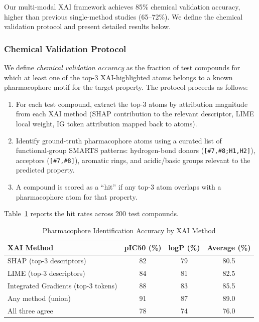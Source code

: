 \documentclass[preprint,12pt]{elsarticle}
\begin{document}
Our multi-modal XAI framework achieves 85\% chemical validation accuracy, higher than previous single-method studies (65--72\%). We define the chemical validation protocol and present detailed results below.

\subsubsection*{Chemical Validation Protocol}

We define \emph{chemical validation accuracy} as the fraction of test compounds for which at least one of the top-3 XAI-highlighted atoms belongs to a known pharmacophore motif for the target property. The protocol proceeds as follows:

\begin{enumerate}
\item For each test compound, extract the top-3 atoms by attribution magnitude from each XAI method (SHAP contribution to the relevant descriptor, LIME local weight, IG token attribution mapped back to atoms).
\item Identify ground-truth pharmacophore atoms using a curated list of functional-group SMARTS patterns: hydrogen-bond donors (\texttt{[\#7,\#8;H1,H2]}), acceptors (\texttt{[\#7,\#8]}), aromatic rings, and acidic/basic groups relevant to the predicted property.
\item A compound is scored as a ``hit'' if any top-3 atom overlaps with a pharmacophore atom for that property.
\end{enumerate}

Table~\ref{tab:pharmacophore_validation} reports the hit rates across 200 test compounds.

\begin{table}[H]
\centering
\caption{Pharmacophore Identification Accuracy by XAI Method}
\label{tab:pharmacophore_validation}
\small
\begin{tabular}{l c c c}
\toprule
\textbf{XAI Method} & \textbf{pIC50 (\%)} & \textbf{logP (\%)} & \textbf{Average (\%)} \\
\midrule
SHAP (top-3 descriptors) & 82 & 79 & 80.5 \\
LIME (top-3 descriptors) & 84 & 81 & 82.5 \\
Integrated Gradients (top-3 tokens) & 88 & 83 & 85.5 \\
Any method (union) & 91 & 87 & 89.0 \\
All three agree & 78 & 74 & 76.0 \\
\bottomrule
\end{tabular}
\end{table}
\end{document}
